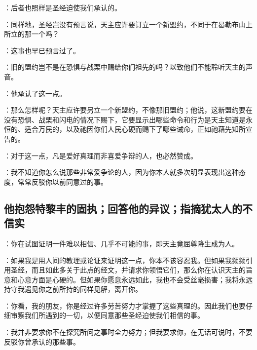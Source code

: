 ：后者也照样是圣经迫使我们承认的。\par

：同样地，圣经岂没有预言说，天主应许要订立一个新盟约，不同于在曷勒布山上所立的那一个吗？\par

：这事也早已预言过了。\par

：旧的盟约岂不是在恐惧与战栗中赐给你们祖先的吗？以致他们不能聆听天主的声音。\par

：他承认了这一点。\par

：那么怎样呢？天主应许要另立一个新盟约，不像那旧盟约；他说，这新盟约要在没有恐惧、战栗和闪电的情况下赐下，它要显示出哪些命令和行为是天主知道是永恒的、适合万民的，以及祂因你们人民心硬而赐下了哪些诫命，正如祂藉先知所宣告的。\par

：对于这一点，凡是爱好真理而非喜爱争辩的人，也必然赞成。\par

：我不知道你怎么说那些非常爱争论的人，因为你本人就多次明显表现出这种态度，常常反驳你以前同意过的事。\par


\subsection{他抱怨特黎丰的固执；回答他的异议；指摘犹太人的不信实}

：你在试图证明一件难以相信、几乎不可能的事，即天主竟屈尊降生成为人。\par

：如果我是用人间的教理或论证来证明这一点，你本不该容忍我。但如果我频频引用圣经，而且如此多关于此点的经文，并请求你领悟它们，那么你在认识天主的旨意和心意方面是心硬的。但如果你愿意永远如此，我也不会受丝毫损害；我将永远持守我遇见你之前所持的同样见解，离开你。\par

：你看，我的朋友，你是经过许多劳苦努力才掌握了这些真理的。因此我们也要仔细审察我们所遇到的一切，以便同意那些圣经迫使我们相信的事。\par

：我并非要求你不在探究所问之事时全力努力；但我要求你，在无话可说时，不要反驳你曾承认的那些事。\par

